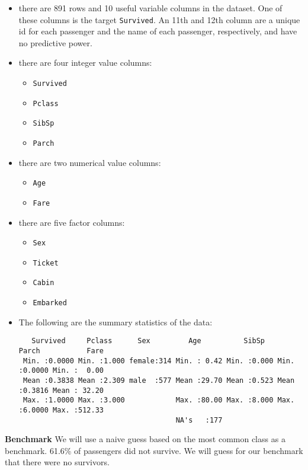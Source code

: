 \documentclass[11pt]{article}
\providecommand{\tightlist}{%
      \setlength{\itemsep}{0pt}\setlength{\parskip}{0pt}}
\begin{document}
\begin{itemize}
\item
  there are 891 rows and 10 useful variable columns in the dataset. One
  of these columns is the target \texttt{Survived}. An 11th and 12th
  column are a unique id for each passenger and the name of each
  passenger, respectively, and have no predictive power.
\item
  there are four integer value columns:

  \begin{itemize}
  \tightlist
  \item
    \texttt{Survived}
  \item
    \texttt{Pclass}
  \item
    \texttt{SibSp}
  \item
    \texttt{Parch}
  \end{itemize}
\item
  there are two numerical value columns:

  \begin{itemize}
  \tightlist
  \item
    \texttt{Age}
  \item
    \texttt{Fare}
  \end{itemize}
\item
  there are five factor columns:

  \begin{itemize}
  \tightlist
  \item
    \texttt{Sex}
  \item
    \texttt{Ticket}
  \item
    \texttt{Cabin}
  \item
    \texttt{Embarked}
  \end{itemize}
\item
  The following are the summary statistics of the data:

\begin{verbatim}
   Survived     Pclass      Sex         Age          SibSp      Parch           Fare         
 Min. :0.0000 Min. :1.000 female:314 Min. : 0.42 Min. :0.000 Min. :0.0000 Min. :  0.00 
 Mean :0.3838 Mean :2.309 male  :577 Mean :29.70 Mean :0.523 Mean :0.3816 Mean : 32.20 
 Max. :1.0000 Max. :3.000            Max. :80.00 Max. :8.000 Max. :6.0000 Max. :512.33 
                                     NA's   :177  
\end{verbatim}
\end{itemize}

\textbf{Benchmark} We will use a naive guess based on the most common
class as a benchmark. 61.6\% of passengers did not survive. We will
guess for our benchmark that there were no survivors.
\end{document}
